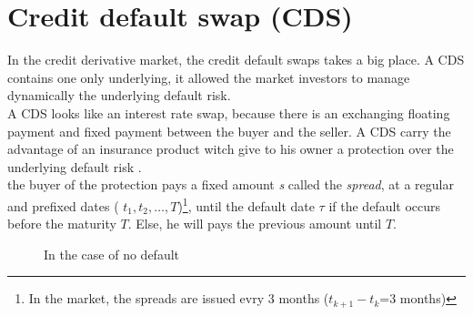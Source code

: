 
\section{Credit default swap (CDS)}
\label{sec:credit-default-swap}

In the credit  derivative market, the credit  default swaps takes a  big place. A
CDS contains  one only  underlying, it  allowed the  market investors  to manage
dynamically the underlying default risk. \\

A CDS looks like  an interest rate swap, because there  is an exchanging floating
payment and fixed  payment between the buyer  and the seller. A  CDS carry the
advantage of an insurance product witch give  to his owner a protection over the
underlying default risk .\\

the  buyer  of  the  protection  pays a  fixed  amount  \textit{s}  called  the
\textit{spread},   at  a   regular  and   prefixed  dates   (  $t_1,t_2,   \dots
,T$)\footnote{In   the  market,   the   spreads  are   issued   evry  3   months
  ($t_{k+1}-t_k$=3 months)}, until the default date $\tau$
if the default  occurs before the maturity  $T$. Else, he will  pays the previous
amount until $T$. \\


\begin{figure}[H]
  \centering
  \caption{In the case of no default}
\end{figure}


